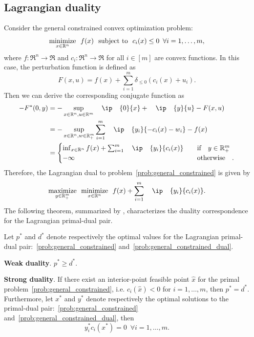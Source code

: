 \subsection{Lagrangian duality}
Consider the general constrained convex optimization problem:
\begin{equation} \label{prob:general_constrained} 
    \displaystyle\mathop{\hbox{\rm minimize}}_{x \in \mathbb{R}^n}\enspace f(x) \enspace\mathop{\hbox{\rm subject to}}\enspace c_i(x) \leq 0 \enspace \forall i = 1, \dots, m,
\end{equation}
where $f:\Re^n\to\Re$ and $c_i:\Re^n\to\Re$ for all $i\in[m]$ are convex functions. In this case, the perturbation function is defined as 
\begin{equation}
    F(x, u) = f(x) + \sum_{i = 1}^m \delta_{\leq 0}(c_i(x) + u_i).
\end{equation}
Then we can derive the corresponding conjugate function as 
\begin{align*}
    -F^*(0, y) &= -\sup_{x\in\Re^n, u\in\Re^m} \ip{0}{x} + \ip{y}{u} - F(x,u)
             \\&= -\sup_{x\in\Re^n, w\in\Re_+^m} \sum_{i=1}^m \ip{y_i}{- c_i(x) - w_i} - f(x)
             \\&= 
             \begin{cases}
                 \inf_{x\in\Re^n} f(x) + \sum_{i=1}^m \ip{y_i}{c_i(x)} & \text{if} y \in\Re_+^m \\
                 -\infty & \text{otherwise}.
             \end{cases}
\end{align*}
Therefore, the Lagrangian dual to problem~\eqref{prob:general_constrained} is given by
\begin{equation} \label{prob:general_constrained_dual}
    \maximize{y\in\Re_+^m} \minimize{x \in \Re^n} f(x) + \sum_{i=1}^m \ip{y_i}{c_i(x)}.
\end{equation}
The following theorem, summarized by \citet{boyd:2004}, characterizes the duality correspondence for the Lagrangian primal-dual pair. 

\begin{theorem} 
    Let $p^*$ and $d^*$ denote respectively the optimal values for the Lagrangian primal-dual pair:~\eqref{prob:general_constrained} and~\eqref{prob:general_constrained_dual}. 
    \item \textbf{Weak duality}. $p^* \geq d^*$. 
    \item \textbf{Strong duality}. 
    If there exist an interior-point feasible point $\hat x$ for the primal problem~\eqref{prob:general_constrained}, i.e. $c_i(\hat x) < 0$ for $i = 1,\dots,m$, then $p^* = d^*$. Furthermore, let $x^*$ and $y^*$ denote respectively the optimal solutions to the primal-dual pair:~\eqref{prob:general_constrained} and~\eqref{prob:general_constrained_dual}, then 
    \[y_i^*c_i(x^*) = 0 \enspace \forall i = 1,\dots,m.\]
\end{theorem}


